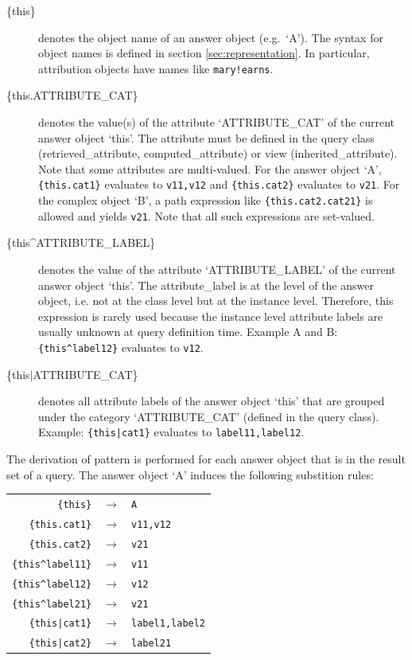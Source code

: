 \begin{description}
\item[\{this\}]
  denotes the object name of an answer object (e.g.\ `A'). The syntax for object names is defined in
  section \ref{sec:representation}. In particular, attribution objects have names like {\tt mary!earns}.

\item[\{this.ATTRIBUTE\_CAT\}]
denotes the value(s) of the attribute `ATTRIBUTE\_CAT' of the current answer object `this'. The attribute must be defined in the query class
(retrieved\_attribute, computed\_attribute) or view (inherited\_attribute). Note that some attributes are multi-valued. For the answer object `A',
\verb+{this.cat1}+ evaluates to {\tt v11,v12} and \verb+{this.cat2}+ evaluates to {\tt v21}. For the complex object `B', a path expression like \verb+{this.cat2.cat21}+ is allowed
and yields {\tt v21}. Note that all such expressions are set-valued.

\item[\{this\^{}ATTRIBUTE\_LABEL\}]
denotes the value of the attribute `ATTRIBUTE\_LABEL' of the current answer object `this'. The attribute\_label is at the level of the answer
object, i.e. not at the class level but at the instance level. Therefore, this expression is rarely used because the instance level attribute labels are
usually unknown at query definition time. Example A and B: \verb+{this^label12}+ evaluates to {\tt v12}.

\item[\{this$\mid$ATTRIBUTE\_CAT\}]
denotes all attribute labels of the answer object `this' that are grouped under the category `ATTRIBUTE\_CAT' (defined in the query class).
Example: \verb+{this|cat1}+ evaluates to \verb+label11,label12+.
\end{description}


The derivation of pattern is performed for each answer object that is in the result set of a query. The answer object `A' induces the following
substition rules:


\begin{tabular}{rcl}
    \verb+{this}+ & $\longrightarrow$ & {\tt A} \\
    \verb+{this.cat1}+ & $\longrightarrow$ & {\tt v11,v12}\\
    \verb+{this.cat2}+ & $\longrightarrow$ & {\tt v21}\\
    \verb+{this^label11}+ & $\longrightarrow$ & {\tt v11}\\
    \verb+{this^label12}+ & $\longrightarrow$ & {\tt v12}\\
    \verb+{this^label21}+ & $\longrightarrow$ & {\tt v21}\\
    \verb+{this|cat1}+ & $\longrightarrow$ & {\tt label1,label2}\\
    \verb+{this|cat2}+ & $\longrightarrow$ & {\tt label21}\\
\end{tabular}

